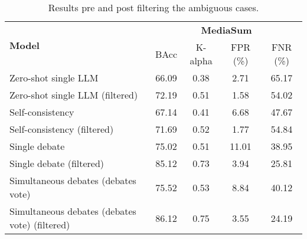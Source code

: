 \begin{table*}
\centering
\begin{tabular}{@{}lcccc@{}}
\toprule
\multirow{2}{*}{\textbf{Model}} & \multicolumn{4}{c}{\textbf{MediaSum}} \\ \cmidrule(l){2-5} 
                                & BAcc  & K-alpha & FPR (\%) & FNR (\%)      

\\ \cmidrule(r){1-5}
Zero-shot single LLM& 66.09	&0.38	&2.71	&65.17
\\
Zero-shot single LLM (filtered) & 72.19	& 0.51	&1.58	&54.02
 \\
\midrule
Self-consistency & 67.14	&0.41&	6.68&	47.67
\\
Self-consistency (filtered) & 71.69	& 0.52 &	1.77	&54.84
 \\
\midrule
Single debate & 75.02	&0.51&	11.01	&38.95
\\
Single debate (filtered) & 85.12&	0.73	&3.94	&25.81
\\
\midrule
Simultaneous debates (debates vote) & 75.52 &	0.53&	8.84&	40.12
 \\
Simultaneous debates (debates vote) (filtered) &86.12	&0.75	&3.55	&24.19
 \\
\bottomrule
\end{tabular}
\caption{Results pre and post filtering the ambiguous cases.}
\label{tab:filtered-main-mediasum}
\end{table*}